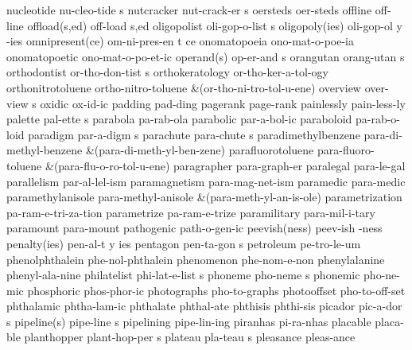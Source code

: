 \5 nucleotide		nu-cleo-tide s		%
\5 nutcracker		nut-crack-er s
\1 oersteds		oer-steds
\1 offline		off-line		%
\2 offload(s,ed)	off-load s,ed		%
\5 oligopolist		oli-gop-o-list s
\3 oligopoly(ies)	oli-gop-ol y -ies
\3 omnipresent(ce)	om-ni-pres-en t ce	%
\1 onomatopoeia		ono-mat-o-poe-ia	%
\1 onomatopoetic	ono-mat-o-po-et-ic	%
\2 operand(s)		op-er-and s
\5 orangutan		orang-utan s
\5 orthodontist 	or-tho-don-tist s
\1 orthokeratology	or-tho-ker-a-tol-ogy
\1 orthonitrotoluene	ortho-nitro-toluene
\tabalign		&\null\quad (or-tho-ni-tro-tol-u-ene)\cr
\5 overview		over-view s
\1 oxidic		ox-id-ic
\1 padding		pad-ding
\1 pagerank		page-rank		%
\1 painlessly		pain-less-ly
\5 palette		pal-ette s		%
\1 parabola		pa-rab-ola
\1 parabolic		par-a-bol-ic
\1 paraboloid		pa-rab-o-loid
\5 paradigm		par-a-digm s
\5 parachute		para-chute s
\1 paradimethylbenzene	para-di-methyl-benzene
\tabalign		&\null\quad (para-di-meth-yl-ben-zene)\cr
\1 parafluorotoluene	para-fluoro-toluene
\tabalign		&\null\quad (para-flu-o-ro-tol-u-ene)\cr
\1 paragrapher		para-graph-er
\1 paralegal		para-le-gal
\1 parallelism		par-al-lel-ism
\1 paramagnetism	para-mag-net-ism
\1 paramedic		para-medic
\1 paramethylanisole	para-methyl-anisole
\tabalign		&\null\quad (para-meth-yl-an-is-ole)\cr
\1 parametrization	pa-ram-e-tri-za-tion	%
\1 parametrize		pa-ram-e-trize
\1 paramilitary 	para-mil-i-tary
\1 paramount		para-mount
\1 pathogenic		path-o-gen-ic
\2 peevish(ness)	peev-ish -ness
\NewWordtrue
\3 penalty(ies)		pen-al-t y ies		%
\5 pentagon		pen-ta-gon s
\1 petroleum		pe-tro-le-um
\1 phenolphthalein	phe-nol-phthalein	%
\1 phenomenon		phe-nom-e-non
\1 phenylalanine 	phenyl-ala-nine		%
\5 philatelist		phi-lat-e-list s
\5 phoneme		pho-neme s              %
\1 phonemic		pho-ne-mic
\1 phosphoric		phos-phor-ic
\1 photographs		pho-to-graphs        %
\1 photooffset		pho-to-off-set  	%
\1 phthalamic		phtha-lam-ic		%
\1 phthalate		phthal-ate		%
\1 phthisis		phthi-sis		%
\5 picador		pic-a-dor s
\2 pipeline(s)		pipe-line s	%
\1 pipelining		pipe-lin-ing		%
\1 piranhas		pi-ra-nhas
\1 placable		placa-ble
\5 planthopper		plant-hop-per s	%
\5 plateau		pla-teau s		%
\1 pleasance		pleas-ance
